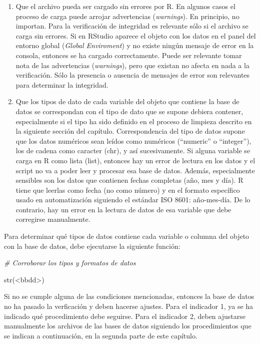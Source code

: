 \documentclass[
  spanish,
]{book}
\newenvironment{Shaded}{\begin{snugshade}}{\end{snugshade}}
\newcommand{\CommentTok}[1]{\textcolor[rgb]{0.56,0.35,0.01}{\textit{#1}}}
\newcommand{\FunctionTok}[1]{\textcolor[rgb]{0.00,0.00,0.00}{#1}}
\newcommand{\NormalTok}[1]{#1}
\newcommand{\SpecialCharTok}[1]{\textcolor[rgb]{0.00,0.00,0.00}{#1}}
\begin{document}
\begin{enumerate}
\def\labelenumi{\arabic{enumi}.}
\item
  Que el archivo pueda ser cargado sin errores por R. En algunos casos el proceso de carga puede arrojar advertencias (\emph{warnings}). En principio, no importan. Para la verificación de integridad es relevante sólo si el archivo se carga sin errores. Si en RStudio aparece el objeto con los datos en el panel del entorno global (\emph{Global Enviroment}) y no existe ningún mensaje de error en la consola, entonces se ha cargado correctamente. Puede ser relevante tomar nota de las advertencias (\emph{warnings}), pero que existan no afecta en nada a la verificación. Sólo la presencia o ausencia de mensajes de error son relevantes para determinar la integridad.
\item
  Que los tipos de dato de cada variable del objeto que contiene la base de datos se correspondan con el tipo de dato que se supone debiera contener, especialmente si el tipo ha sido definido en el proceso de limpieza descrito en la siguiente sección del capítulo. Correspondencia del tipo de datos supone que los datos numéricos sean leídos como numéricos (``numeric'' o ``integer''), los de cadena como caracter (chr), y así sucesivamente. Si alguna variable se carga en R como lista (list), entonces hay un error de lectura en los datos y el script no va a poder leer y procesar esa base de datos. Además, especialmente sensibles son los datos que contienen fechas completas (año, mes y día). R tiene que leerlas como fecha (no como número) y en el formato específico usado en automatización siguiendo el estándar ISO 8601: año-mes-día. De lo contrario, hay un error en la lectura de datos de esa variable que debe corregirse manualmente.
\end{enumerate}

Para determinar qué tipos de datos contiene cada variable o columna del objeto con la base de datos, debe ejecutarse la siguiente función:

\begin{Shaded}
\begin{Highlighting}[]
\CommentTok{\# Corroborar los tipos y formatos de datos}

\FunctionTok{str}\NormalTok{(}\SpecialCharTok{\textless{}}\NormalTok{bbdd}\SpecialCharTok{\textgreater{}}\NormalTok{)}
\end{Highlighting}
\end{Shaded}

Si no se cumple alguna de las condiciones mencionadas, entonces la base de datos no ha pasado la verficación y deben hacerse ajustes. Para el indicador 1, ya se ha indicado qué procedimiento debe seguirse. Para el indicador 2, deben ajustarse manualmente los archivos de las bases de datos siguiendo los procedimientos que se indican a continuación, en la segunda parte de este capítulo.
\end{document}
